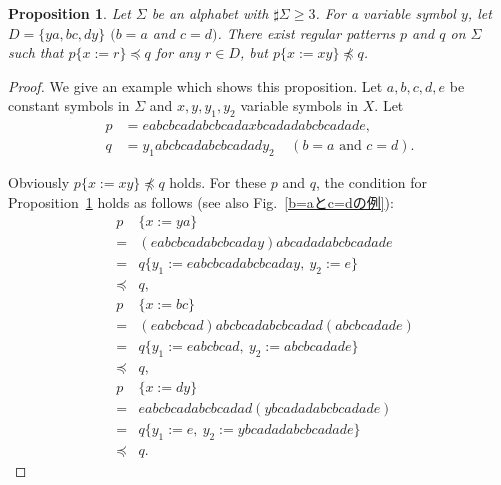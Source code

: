 \newtheorem{prop}{Proposition}

\begin{prop}\label{両方}
  Let $\Sigma$ be an alphabet with $\sharp \Sigma \ge 3$.
  For a variable symbol $y$, let $D= \{ ya, bc, dy \}$ $(b = a$ and $c = d)$. There exist regular patterns $p$ and $q$ on $\Sigma$ such that $p \{ x := r \} \preceq q$ for any $r \in D$, but $p \{ x := xy \} \not \preceq q$.
\end{prop}

\begin{proof}
We give an example which shows this proposition.
Let $a,b,c,d,e$ be constant symbols in $\Sigma$ and 
$x,y,y_{1},y_{2}$ variable symbols in $X$.
Let 
\begin{align*}
p &= eabcbcadabcbcadaxbcadadabcbcadade,\\
q &= y_{1}abcbcadabcbcadady_{2}~~~~~(b = a\mbox{~and~}c = d).
\end{align*}

\noindent
Obviously $p \{ x:=xy \} \not \preceq q$ holds.
For these $p$ and $q$, the condition for Proposition~\ref{両方} holds as follows (see also Fig.~\ref{b=aとc=dの例}):
\begin{eqnarray*}
&p& \{ x:=ya \} \\ 
& = & (eabcbcadabcbcaday)abcadadabcbcadade\\
& = & q \{ y_{1} := eabcbcadabcbcaday,~y_{2}:=e \} \\
& \preceq & q,\\
&p& \{ x:=bc \}  \\
& = & (eabcbcad)abcbcadabcbcadad(abcbcadade) \\
& = & q \{ y_{1} := eabcbcad,~y_{2} := abcbcadade \} \\
& \preceq & q,\\
&p& \{ x:=dy \}  \\
& = & eabcbcadabcbcadad(ybcadadabcbcadade) \\
& = & q \{ y_{1}:=e,~y_{2} := ybcadadabcbcadade \} \\
& \preceq & q.
\end{eqnarray*}
\end{proof}

